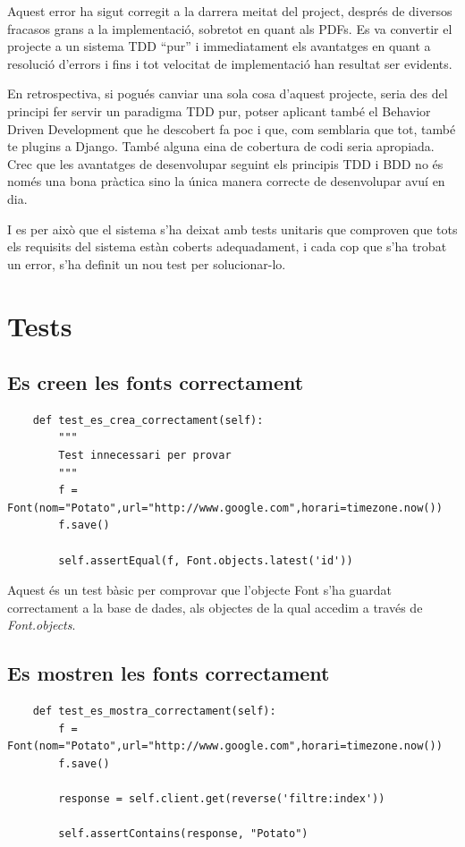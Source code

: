 \documentclass{article}
\begin{document}
Aquest error ha sigut corregit a la darrera meitat del project, després de diversos fracasos grans a la implementació, sobretot en quant als PDFs. Es va convertir el projecte a un sistema TDD ``pur'' i immediatament els avantatges en quant a resolució d'errors i fins i tot velocitat de implementació han resultat ser evidents.

En retrospectiva, si pogués canviar una sola cosa d'aquest projecte, seria des del principi fer servir un paradigma TDD pur, potser aplicant també el Behavior Driven Development que he descobert fa poc i que, com semblaria que tot, també te plugins a Django. També alguna eina de cobertura de codi seria apropiada. Crec que les avantatges de desenvolupar seguint els principis TDD i BDD no és només una bona pràctica sino la única manera correcte de desenvolupar avuí en dia.

I es per això que el sistema s'ha deixat amb tests unitaris que comproven que tots els requisits del sistema estàn coberts adequadament, i cada cop que s'ha trobat un error, s'ha definit un nou test per solucionar-lo.

\newpage

\section{Tests}

\subsection{Es creen les fonts correctament}

\begin{lstlisting}
    def test_es_crea_correctament(self):
        """
        Test innecessari per provar
        """
        f = Font(nom="Potato",url="http://www.google.com",horari=timezone.now())
        f.save()

        self.assertEqual(f, Font.objects.latest('id'))
\end{lstlisting}

Aquest és un test bàsic per comprovar que l'objecte Font s'ha guardat correctament a la base de dades, als objectes de la qual accedim a través de \emph{Font.objects}.

\subsection{Es mostren les fonts correctament}

\begin{lstlisting}
    def test_es_mostra_correctament(self):
        f = Font(nom="Potato",url="http://www.google.com",horari=timezone.now())
        f.save()

        response = self.client.get(reverse('filtre:index'))

        self.assertContains(response, "Potato")
\end{lstlisting}
\end{document}
